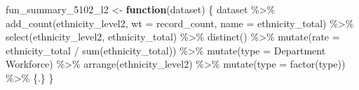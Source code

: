 \documentclass[
]{article}
\newenvironment{Shaded}{\begin{snugshade}}{\end{snugshade}}
\newcommand{\AttributeTok}[1]{\textcolor[rgb]{0.77,0.63,0.00}{#1}}
\newcommand{\ControlFlowTok}[1]{\textcolor[rgb]{0.13,0.29,0.53}{\textbf{#1}}}
\newcommand{\FunctionTok}[1]{\textcolor[rgb]{0.00,0.00,0.00}{#1}}
\newcommand{\NormalTok}[1]{#1}
\newcommand{\OtherTok}[1]{\textcolor[rgb]{0.56,0.35,0.01}{#1}}
\newcommand{\SpecialCharTok}[1]{\textcolor[rgb]{0.00,0.00,0.00}{#1}}
\newcommand{\StringTok}[1]{\textcolor[rgb]{0.31,0.60,0.02}{#1}}
\begin{document}
\begin{Shaded}
\begin{Highlighting}[]
\NormalTok{fun\_summary\_5102\_l2 }\OtherTok{\textless{}{-}} \ControlFlowTok{function}\NormalTok{(dataset) \{}
\NormalTok{    dataset }\SpecialCharTok{\%\textgreater{}\%}
        \FunctionTok{add\_count}\NormalTok{(ethnicity\_level2,}
                  \AttributeTok{wt =}\NormalTok{ record\_count,}
                  \AttributeTok{name =} \StringTok{\textquotesingle{}ethnicity\_total\textquotesingle{}}\NormalTok{) }\SpecialCharTok{\%\textgreater{}\%}
        \FunctionTok{select}\NormalTok{(ethnicity\_level2, ethnicity\_total) }\SpecialCharTok{\%\textgreater{}\%}
        \FunctionTok{distinct}\NormalTok{() }\SpecialCharTok{\%\textgreater{}\%}
        \FunctionTok{mutate}\NormalTok{(}\AttributeTok{rate =}\NormalTok{ ethnicity\_total }\SpecialCharTok{/} \FunctionTok{sum}\NormalTok{(ethnicity\_total)) }\SpecialCharTok{\%\textgreater{}\%}
        \FunctionTok{mutate}\NormalTok{(}\AttributeTok{type =} \StringTok{\textquotesingle{}Department Workforce\textquotesingle{}}\NormalTok{) }\SpecialCharTok{\%\textgreater{}\%}
        \FunctionTok{arrange}\NormalTok{(ethnicity\_level2) }\SpecialCharTok{\%\textgreater{}\%}
        \FunctionTok{mutate}\NormalTok{(}\AttributeTok{type =} \FunctionTok{factor}\NormalTok{(type)) }\SpecialCharTok{\%\textgreater{}\%} 
\NormalTok{        \{.\}}
\NormalTok{\}}


\end{Highlighting}
\end{Shaded}
\end{document}
